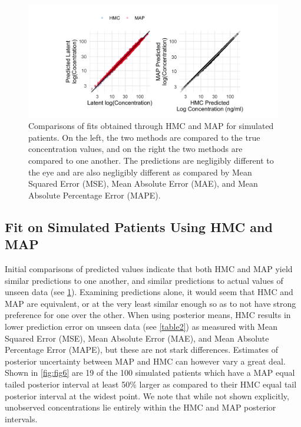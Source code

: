 \begin{figure}
	\centering
	\includegraphics[width=1\linewidth]{figs/compare}
	\caption{Comparisons of fits obtained through HMC and MAP for simulated patients.  On the left, the two methods are compared to the true concentration values, and on the right the two methods are compared to one another.  The predictions are negligibly different to the eye and are also negligibly different as compared by Mean Squared Error (MSE), Mean Absolute Error (MAE), and Mean Absolute Percentage Error (MAPE).}
	\label{fig:fig5}
\end{figure}



\subsection*{Fit on Simulated Patients Using HMC and MAP}

Initial comparisons of predicted values indicate that both HMC and MAP yield similar predictions to one another, and similar predictions to actual values of unseen data (see \cref{fig:fig5}).  Examining predictions alone, it would seem that HMC and MAP are equivalent, or at the very least similar enough so as to not have strong preference for one over the other. When using posterior means, HMC results in lower prediction error on unseen data (see \cref{table2}) as measured with Mean Squared Error (MSE), Mean Absolute Error (MAE), and Mean Absolute Percentage Error (MAPE), but these are not stark differences. Estimates of posterior uncertainty between MAP and HMC can however vary a great deal. Shown in \cref{fig:fig6} are 19 of the 100 simulated patients which have a MAP equal tailed posterior interval at least 50\% larger as compared to their HMC equal tail posterior interval at the widest point. We note that while not shown explicitly, unobserved concentrations lie entirely within the HMC and MAP posterior intervals.



